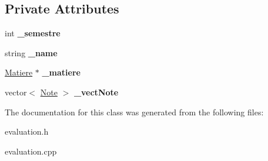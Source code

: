 \subsection*{Private Attributes}
\begin{DoxyCompactItemize}
\item 
\hypertarget{class_evaluation_ae06780160e3563e94ef1dc2f46aead76}{int {\bfseries \-\_\-semestre}}\label{class_evaluation_ae06780160e3563e94ef1dc2f46aead76}

\item 
\hypertarget{class_evaluation_a536c04a1c4da35d96f08ff23fb3eb5eb}{string {\bfseries \-\_\-name}}\label{class_evaluation_a536c04a1c4da35d96f08ff23fb3eb5eb}

\item 
\hypertarget{class_evaluation_aad6d1ffabfe582a3e1471761674d273a}{\hyperlink{class_matiere}{Matiere} $\ast$ {\bfseries \-\_\-matiere}}\label{class_evaluation_aad6d1ffabfe582a3e1471761674d273a}

\item 
\hypertarget{class_evaluation_a9df542e9c07ef0c0625d549f647c2d17}{vector$<$ \hyperlink{class_note}{Note} $>$ {\bfseries \-\_\-vect\-Note}}\label{class_evaluation_a9df542e9c07ef0c0625d549f647c2d17}

\end{DoxyCompactItemize}


The documentation for this class was generated from the following files\-:\begin{DoxyCompactItemize}
\item 
evaluation.\-h\item 
evaluation.\-cpp\end{DoxyCompactItemize}
